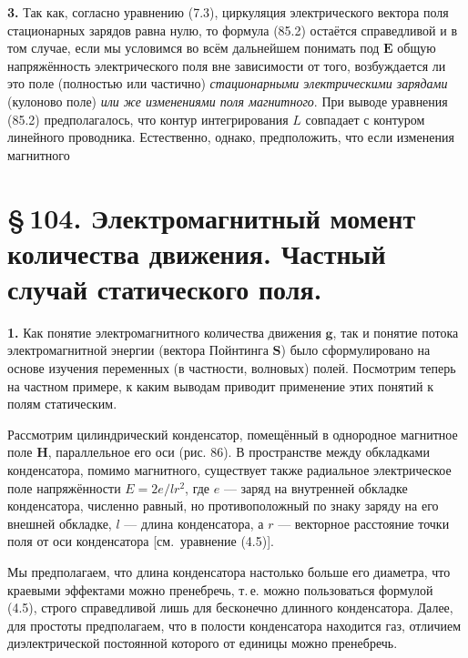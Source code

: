 \documentclass[a4paper,10pt]{article}
\begin{document}
\textbf{3.} Так как, согласно уравнению (7.3), циркуляция электрического
вектора поля стационарных зарядов равна нулю, то формула (85.2) остаётся
справедливой и в том случае, если мы условимся во всём дальнейшем
понимать под $\mathbf{E}$ общую напряжённость электрического поля вне
зависимости от того, возбуждается ли это поле (полностью или частично)
\textit{стационарными электрическими зарядами} (кулоново поле) \textit{или
же изменениями поля магнитного}. При выводе уравнения (85.2) предполагалось,
что контур интегрирования $L$ совпадает с контуром линейного проводника.
Естественно, однако, предположить, что если изменения магнитного


\section*{\S\,104. Электромагнитный момент количества движения.
Частный случай статического поля.}


\textbf{1.} Как понятие электромагнитного количества движения $\mathbf{g}$,
так и понятие потока электромагнитной энергии (вектора Пойнтинга
$\mathbf{S}$) было сформулировано на основе изучения переменных (в
частности, волновых) полей. Посмотрим теперь на частном примере, к каким
выводам приводит применение этих понятий к полям статическим.

Рассмотрим цилиндрический конденсатор, помещённый в однородное
магнитное поле $\mathbf{H}$, параллельное его оси (рис. 86). В
пространстве между обкладками конденсатора, помимо магнитного, существует
также радиальное электрическое поле напряжённости $E = 2e/lr^2$, где
$e$ — заряд на внутренней обкладке конденсатора, численно равный, но
противоположный по знаку заряду на его внешней обкладке, $l$ — длина
конденсатора, а $r$ — векторное расстояние точки поля от оси конденсатора
[см.\ уравнение (4.5)].

Мы предполагаем, что длина конденсатора настолько больше его диаметра,
что краевыми эффектами можно пренебречь, т.\,е. можно пользоваться
формулой (4.5), строго справедливой лишь для бесконечно длинного
конденсатора. Далее, для простоты предполагаем, что в полости конденсатора
находится газ, отличием диэлектрической постоянной которого от единицы
можно пренебречь.
\end{document}
